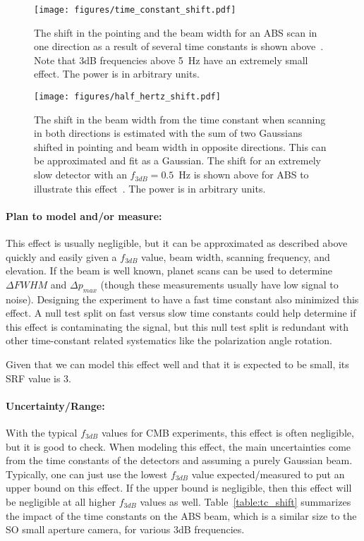 \begin{figure}[h!]
\centering
\texttt{[image: figures/time\_constant\_shift.pdf]}
\caption{The shift in the pointing and the beam width for an ABS scan in one direction as a result of several time constants is shown above~\cite{Simon_Thesis_2016}. Note that 3dB frequencies above 5~Hz have an extremely small effect. The power is in arbitrary units.}
\label{fig:tc_shift}
\end{figure}


\begin{figure}[h!]
\centering
\texttt{[image: figures/half\_hertz\_shift.pdf]}
\caption{The shift in the beam width from the time constant when scanning in both directions is estimated with the sum of two Gaussians shifted in pointing and beam width in opposite directions. This can be approximated and fit as a Gaussian. The shift for an extremely slow detector with an $f_{3dB}=0.5$~Hz is shown above for ABS to illustrate this effect~\cite{Simon_Thesis_2016}. The power is in arbitrary units.}
\label{fig:tc_beam_shift}
\end{figure}

\paragraph{Plan to model and/or measure:}

This effect is usually negligible, but it can be approximated as described above quickly and easily given a $f_{3dB}$ value, beam width, scanning frequency, and elevation. If the beam is well known, planet scans can be used to determine $\Delta FWHM$ and $\Delta p_{max}$ (though these measurements usually have low signal to noise). Designing the experiment to have a fast time constant also minimized this effect. A null test split on fast versus slow time constants could help determine if this effect is contaminating the signal, but this null test split is redundant with other time-constant related systematics like the polarization angle rotation. 

Given that we can model this effect well and that it is expected to be small, its SRF value is 3.

\paragraph{Uncertainty/Range:}
With the typical $f_{3dB}$ values for CMB experiments, this effect is often negligible, but it is good to check. When modeling this effect, the main uncertainties come from the time constants of the detectors and assuming a purely Gaussian beam. Typically, one can just use the lowest $f_{3dB}$ value expected/measured to put an upper bound on this effect. If the upper bound is negligible, then this effect will be negligible at all higher $f_{3dB}$ values as well. Table~\ref{table:tc_shift} summarizes the impact of the time constants on the ABS beam, which is a similar size to the SO small aperture camera, for various 3dB frequencies.

